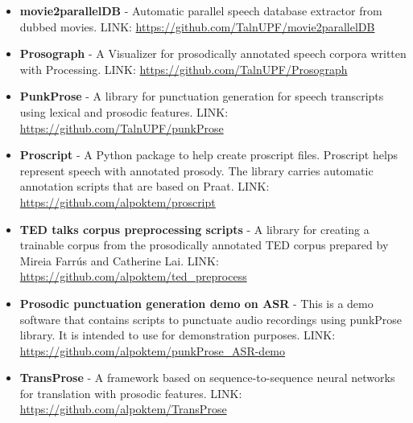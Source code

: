 \begin{itemize}
    \item \textbf{movie2parallelDB} - Automatic parallel speech database extractor from dubbed movies. LINK: \url{https://github.com/TalnUPF/movie2parallelDB}
    \item \textbf{Prosograph} - A Visualizer for prosodically annotated speech corpora written with Processing. LINK: \url{https://github.com/TalnUPF/Prosograph}
    \item \textbf{PunkProse} - A library for punctuation generation for speech transcripts using lexical and prosodic features. LINK: \url{https://github.com/TalnUPF/punkProse}
    \item \textbf{Proscript} - A Python package to help create proscript files. Proscript helps represent speech with annotated prosody. The library carries automatic annotation scripts that are based on Praat. LINK: \url{https://github.com/alpoktem/proscript}
    \item \textbf{TED talks corpus preprocessing scripts} - A library for creating a trainable corpus from the prosodically annotated TED corpus prepared by Mireia Farrús and Catherine Lai. LINK: \url{https://github.com/alpoktem/ted_preprocess}
    \item \textbf{Prosodic punctuation generation demo on ASR} - This is a demo software that contains scripts to punctuate audio recordings using punkProse library. It is intended to use for demonstration purposes. LINK: \url{https://github.com/alpoktem/punkProse_ASR-demo}
    \item \textbf{TransProse} - A framework based on sequence-to-sequence neural networks for translation with prosodic features. LINK: \url{https://github.com/alpoktem/TransProse}
\end{itemize}

